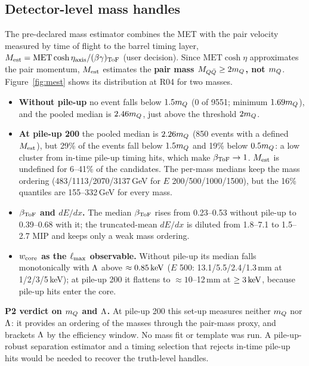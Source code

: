 \subsection{Detector-level mass handles}\label{sec:mlam:mass}
The pre-declared mass estimator combines the MET with the pair velocity measured by time of flight to the barrel timing
layer, $M_{\rm est}=\mathrm{MET}\cosh\eta_{\rm axis}/(\beta\gamma)_{\rm ToF}$ (user decision). Since $\mathrm{MET}\cosh\eta$
approximates the pair momentum, $M_{\rm est}$ estimates the \textbf{pair mass $M_{Q\bar Q}\ge2m_Q$, not $m_Q$}.
Figure~\ref{fig:mest} shows its distribution at R04 for two masses.
\begin{itemize}
\item \textbf{Without pile-up} no event falls below $1.5m_Q$ (0 of 9551; minimum $1.69m_Q$), and the pooled median is
  $2.46m_Q$, just above the threshold $2m_Q$.
\item \textbf{At pile-up 200} the pooled median is $2.26m_Q$ (850 events with a defined $M_{\rm est}$), but 29\% of the
  events fall below $1.5m_Q$ and 19\% below $0.5m_Q$: a low cluster from in-time pile-up timing hits, which make
  $\beta_{\rm ToF}\to1$. $M_{\rm est}$ is undefined for 6--41\% of the candidates. The per-mass medians keep the mass
  ordering (483/1113/2070/3137\,GeV for $E$ 200/500/1000/1500), but the 16\% quantiles are 155--332\,GeV for every mass.
\item \textbf{$\beta_{\rm ToF}$ and $dE/dx$.} The median $\beta_{\rm ToF}$ rises from 0.23--0.53 without pile-up to 0.39--0.68
  with it; the truncated-mean $dE/dx$ is diluted from 1.8--7.1 to 1.5--2.7 MIP and keeps only a weak mass ordering.
\item \textbf{$w_{\rm core}$ as the $\ell_{\max}$ observable.} Without pile-up its median falls monotonically with $\Lambda$ above
  $\approx0.85\,\mathrm{keV}$ ($E$ 500: 13.1/5.5/2.4/1.3\,mm at 1/2/3/5\,keV); at pile-up 200 it flattens to $\approx10$--12\,mm at
  $\ge3\,\mathrm{keV}$, because pile-up hits enter the core.
\end{itemize}
\textbf{P2 verdict on $m_Q$ and $\Lambda$.} At pile-up 200 this set-up measures neither $m_Q$ nor $\Lambda$: it provides an
ordering of the masses through the pair-mass proxy, and brackets $\Lambda$ by the efficiency window. No mass fit or template
was run. A pile-up-robust separation estimator and a timing selection that rejects in-time pile-up hits would be needed to
recover the truth-level handles.

